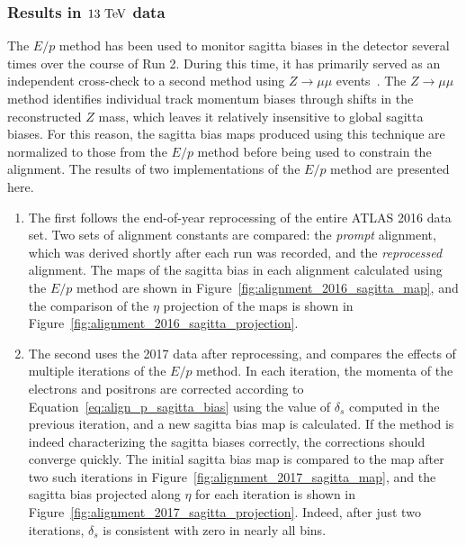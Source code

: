 \subsubsection{Results in $13\tev$ data}
The $E/p$ method has been used to monitor sagitta biases in the detector several times over the course of Run 2.
During this time, it has primarily served as an independent cross-check to a second method using $Z\rightarrow\mu\mu$ events~\cite{2012.alignment-systematics}.
The $Z\rightarrow\mu\mu$ method identifies individual track momentum biases through shifts in the reconstructed $Z$ mass, which leaves it relatively insensitive to global sagitta biases.
For this reason, the sagitta bias maps produced using this technique are normalized to those from the $E/p$ method before being used to constrain the alignment. 
The results of two implementations of the $E/p$ method are presented here.
\begin{enumerate}
\item The first follows the end-of-year reprocessing of the entire ATLAS 2016 data set. %
Two sets of alignment constants are compared: the \emph{prompt} alignment, which was derived shortly after each run was recorded, and the \emph{reprocessed} alignment.
The maps of the sagitta bias in each alignment calculated using the $E/p$ method are shown in Figure~\ref{fig:alignment_2016_sagitta_map}, and the comparison of the $\eta$ projection of the maps is shown in Figure~\ref{fig:alignment_2016_sagitta_projection}.
\item The second uses the 2017 data after reprocessing, and compares the effects of multiple iterations of the $E/p$ method.
In each iteration, the momenta of the electrons and positrons are corrected according to Equation~\ref{eq:align_p_sagitta_bias} using the value of $\delta_s$ computed in the previous iteration, and a new sagitta bias map is calculated.
If the method is indeed characterizing the sagitta biases correctly, the corrections should converge quickly.
The initial sagitta bias map is compared to the map after two such iterations in Figure~\ref{fig:alignment_2017_sagitta_map}, and the sagitta bias projected along $\eta$ for each iteration is shown in Figure~\ref{fig:alignment_2017_sagitta_projection}.
Indeed, after just two iterations, $\delta_s$ is consistent with zero in nearly all bins.
\end{enumerate}

